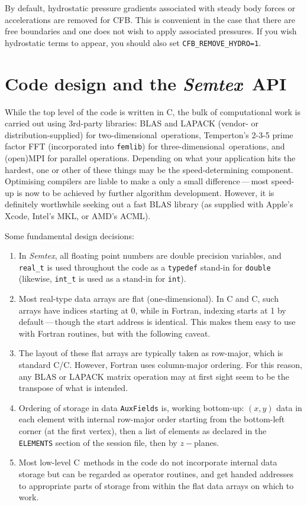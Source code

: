 \documentclass[11pt]{report}
\newcommand{\Semtex}{\emph{Semtex}} \newcommand{\Dog}{\emph{Dog}}
\newcommand\oned{one-di\-men\-sion\-al}
\newcommand\twod{two-di\-men\-sion\-al}
\newcommand\threed{three-di\-men\-sion\-al}
\newcommand\cpp{C\nolinebreak\hspace{-.05em}\raisebox{.3ex}{\footnotesize\bf
+}\nolinebreak\hspace{-.10em}\raisebox{.3ex}{\footnotesize\bf+}}
\begin{document}
By default, hydrostatic pressure gradients associated with steady body
forces or accelerations are removed for CFB.  This is convenient in
the case that there are free boundaries and one does not wish to apply
associated pressures.  If you wish hydrostatic terms to appear, you
should also set \verb|CFB_REMOVE_HYDRO=1|.
 

\chapter{Code design and the \Semtex\ API}
\label{ch.api}



While the top level of the code is written in \cpp, the bulk of
computational work is carried out using 3rd-party libraries: BLAS and
LAPACK (vendor- or distribution-supplied) for \twod\ operations,
Temperton's 2-3-5 prime factor FFT (incorporated into \texttt{femlib})
for \threed\ operations, and (open)MPI for parallel operations.
Depending on what your application hits the hardest, one or other of
these things may be the speed-determining component. Optimising
compilers are liable to make a only a small difference\,---\,most
speed-up is now to be achieved by further algorithm development.
However, it is definitely worthwhile seeking out a fast BLAS library
(as supplied with Apple's Xcode, Intel's MKL, or AMD's ACML).

Some fundamental design decisions:
\begin{enumerate}
\item
  In \Semtex, all floating point numbers are double precision
  variables, and \verb|real_t| is used throughout the code as a
  \verb|typedef| stand-in for \verb|double| (likewise, \verb|int_t| is
  used as a stand-in for \verb|int|).
\item
  Most real-type data arrays are flat (\oned).  In C and \cpp, such
  arrays have indices starting at 0, while in Fortran, indexing starts
  at 1 by default\,---\,though the start address is identical. This
  makes them easy to use with Fortran routines, but with the following
  caveat.
\item
  The layout of these flat arrays are typically taken as row-major,
  which is standard C/\cpp. However, Fortran uses column-major
  ordering. For this reason, any BLAS or LAPACK matrix operation may
  at first sight seem to be the transpose of what is intended.
\item
  Ordering of storage in data \verb|AuxFields| is, working bottom-up:
  $(x,y)$ data in each element with internal row-major order starting
  from the bottom-left corner (\ie at the first vertex), then a list
  of elements as declared in the \verb|ELEMENTS| section of the
  session file, then by $z-$planes.
\item
  Most low-level \cpp\ methods in the code do not incorporate internal
  data storage but can be regarded as operator routines, and get
  handed addresses to appropriate parts of storage from within the
  flat data arrays on which to work.
\end{enumerate}
\end{document}
